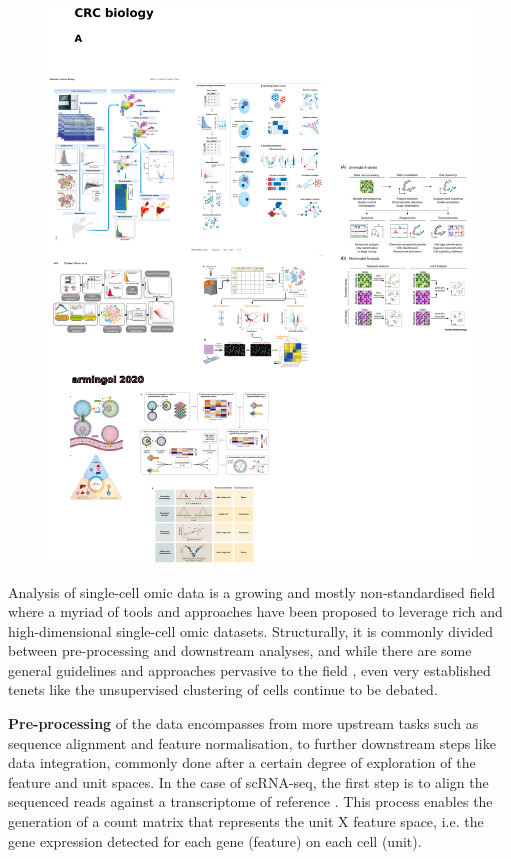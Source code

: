 \begin{figure}
    \centering
    \includegraphics{01intro/figs/1COMP_analysis.png}
    \caption{}
    \label{fig:fig6}
\end{figure}

Analysis of single-cell omic data is a growing and mostly non-standardised field where a myriad of tools and approaches have been proposed to leverage rich and high-dimensional single-cell omic datasets. Structurally, it is commonly divided between pre-processing and downstream analyses, and while there are some general guidelines and approaches pervasive to the field \cite{luecken_current_2019, heumos_best_2023}, even very established tenets like the unsupervised clustering of cells continue to be debated.

\textbf{Pre-processing} of the data encompasses from more upstream tasks such as sequence alignment and feature normalisation, to further downstream steps like data integration, commonly done after a certain degree of exploration of the feature and unit spaces. In the case of scRNA-seq, the first step is to align the sequenced reads against a transcriptome of reference \cite{dobin_star_2013,bray_near-optimal_2016}. This process enables the generation of a count matrix that represents the unit X feature space, i.e. the gene expression detected for each gene (feature) on each cell (unit).


